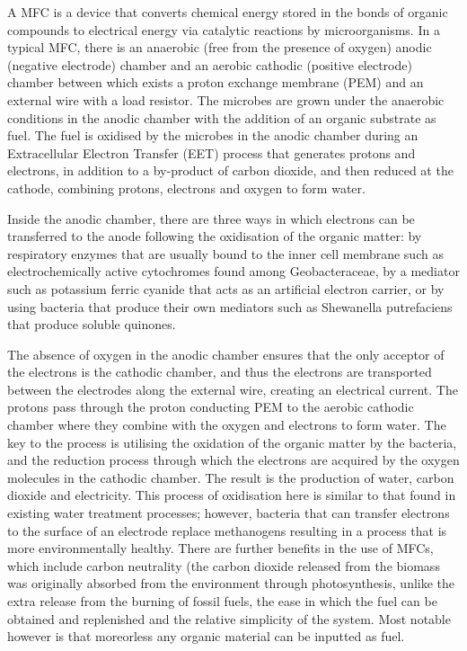 \documentclass[12pt]{article}
\begin{document}
A MFC is a device that converts chemical energy stored in the bonds of organic compounds to electrical energy via catalytic reactions by microorganisms. In a typical MFC, there is an anaerobic (free from the presence of oxygen) anodic (negative electrode) chamber and an aerobic cathodic (positive electrode) chamber between which exists a proton exchange membrane (PEM) and an external wire with a load resistor. The microbes are grown under the anaerobic conditions in the anodic chamber with the addition of an organic substrate as fuel.  The fuel is oxidised by the microbes in the anodic chamber during an Extracellular Electron Transfer (EET) process that generates protons and electrons, in addition to a by-product of carbon dioxide, and then reduced at the cathode, combining protons, electrons and oxygen to form water. \cite{du2007state,logan2006microbial}


Inside the anodic chamber, there are three ways in which electrons can be transferred to the anode following the oxidisation of the organic matter: by respiratory enzymes that are usually bound to the inner cell membrane such as electrochemically active cytochromes found among Geobacteraceae, by a mediator such as potassium ferric cyanide that acts as an artificial electron carrier, or by using bacteria that produce their own mediators such as Shewanella putrefaciens that produce soluble quinones.\cite{ghangrekar2006wastewater} \cite{min2004continuous}

The absence of oxygen in the anodic chamber ensures that the only acceptor of the electrons is the cathodic chamber, and thus the electrons are transported between the electrodes along the external wire, creating an electrical current. The protons pass through the proton conducting PEM to the aerobic cathodic chamber where they combine with the oxygen and electrons to form water. The key to the process is utilising the oxidation of the organic matter by the bacteria, and the reduction process through which the electrons are acquired by the oxygen molecules in the cathodic chamber. The result is the production of water, carbon dioxide and electricity. This process of oxidisation here is similar to that found in existing water treatment processes; however, bacteria that can transfer electrons to the surface of an electrode replace methanogens resulting in a process that is more environmentally healthy.\cite{ghangrekar2006microbial} There are further benefits in the use of MFCs, which include carbon neutrality (the carbon dioxide released from the biomass was originally absorbed from the environment through photosynthesis, unlike the extra release from the burning of fossil fuels, the ease in which the fuel can be obtained and replenished and the relative simplicity of the system. Most notable however is that moreorless any organic material can be inputted as fuel.  \cite{liu2004production}
\end{document}
